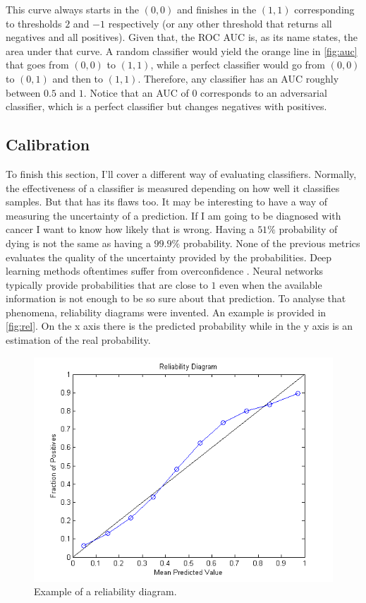 This curve always starts in the $(0,0)$ and finishes in the $(1,1)$ corresponding to thresholds $2$ and $-1$ respectively (or any other threshold that returns all negatives and all positives). Given that, the ROC AUC is, as its name states, the area under that curve. A random classifier would yield the orange line in \autoref{fig:auc} that goes from $(0,0)$ to $(1,1)$, while a perfect classifier would go from $(0,0)$ to $(0,1)$ and then to $(1,1)$. Therefore, any classifier has an AUC roughly between $0.5$ and $1$. Notice that an AUC of $0$ corresponds to an adversarial classifier, which is a perfect classifier but changes negatives with positives.

\subsection{Calibration}

To finish this section, I'll cover a different way of evaluating classifiers. Normally, the effectiveness of a classifier is measured depending on how well it classifies samples. But that has its flaws too. It may be interesting to have a way of measuring the uncertainty of a prediction. If I am going to be diagnosed with cancer I want to know how likely that is wrong. Having a $51\%$ probability of dying is not the same as having a $99.9\%$ probability. None of the previous metrics evaluates the quality of the uncertainty provided by the probabilities. Deep learning methods oftentimes suffer from overconfidence \cite{wei2022mitigating, meronen2023fixing, melotti2022reducing}. Neural networks typically provide probabilities that are close to $1$ even when the available information is not enough to be so sure about that prediction. To analyse that phenomena, reliability diagrams were invented. An example is provided in \autoref{fig:rel}. On the x axis there is the predicted probability while in the y axis is an estimation of the real probability.

\begin{figure}[ht]
    \centering
    \includegraphics[width=\textwidth]{imgs/rel.png}
    \caption{Example of a reliability diagram.}
    \label{fig:rel}
\end{figure}

